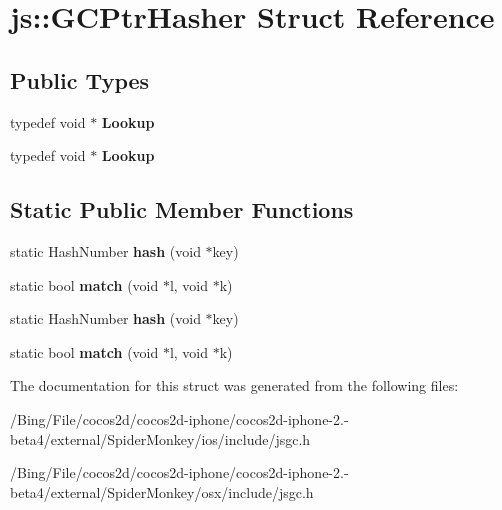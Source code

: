 \hypertarget{structjs_1_1_g_c_ptr_hasher}{\section{js\-:\-:G\-C\-Ptr\-Hasher Struct Reference}
\label{structjs_1_1_g_c_ptr_hasher}
}
\subsection*{Public Types}
\begin{DoxyCompactItemize}
\item 
\hypertarget{structjs_1_1_g_c_ptr_hasher_ad097f82cd12497b9625b6ed452a013db}{typedef void $\ast$ {\bfseries Lookup}}\label{structjs_1_1_g_c_ptr_hasher_ad097f82cd12497b9625b6ed452a013db}

\item 
\hypertarget{structjs_1_1_g_c_ptr_hasher_ad097f82cd12497b9625b6ed452a013db}{typedef void $\ast$ {\bfseries Lookup}}\label{structjs_1_1_g_c_ptr_hasher_ad097f82cd12497b9625b6ed452a013db}

\end{DoxyCompactItemize}
\subsection*{Static Public Member Functions}
\begin{DoxyCompactItemize}
\item 
\hypertarget{structjs_1_1_g_c_ptr_hasher_a5d676d0b508f8a25ccb07cbf065b68e0}{static Hash\-Number {\bfseries hash} (void $\ast$key)}\label{structjs_1_1_g_c_ptr_hasher_a5d676d0b508f8a25ccb07cbf065b68e0}

\item 
\hypertarget{structjs_1_1_g_c_ptr_hasher_a2638c32ed92a29d21a0f91aab1705a18}{static bool {\bfseries match} (void $\ast$l, void $\ast$k)}\label{structjs_1_1_g_c_ptr_hasher_a2638c32ed92a29d21a0f91aab1705a18}

\item 
\hypertarget{structjs_1_1_g_c_ptr_hasher_a5d676d0b508f8a25ccb07cbf065b68e0}{static Hash\-Number {\bfseries hash} (void $\ast$key)}\label{structjs_1_1_g_c_ptr_hasher_a5d676d0b508f8a25ccb07cbf065b68e0}

\item 
\hypertarget{structjs_1_1_g_c_ptr_hasher_a2638c32ed92a29d21a0f91aab1705a18}{static bool {\bfseries match} (void $\ast$l, void $\ast$k)}\label{structjs_1_1_g_c_ptr_hasher_a2638c32ed92a29d21a0f91aab1705a18}

\end{DoxyCompactItemize}


The documentation for this struct was generated from the following files\-:\begin{DoxyCompactItemize}
\item 
/\-Bing/\-File/cocos2d/cocos2d-\/iphone/cocos2d-\/iphone-\/2.-\/beta4/external/\-Spider\-Monkey/ios/include/jsgc.\-h\item 
/\-Bing/\-File/cocos2d/cocos2d-\/iphone/cocos2d-\/iphone-\/2.-\/beta4/external/\-Spider\-Monkey/osx/include/jsgc.\-h\end{DoxyCompactItemize}
